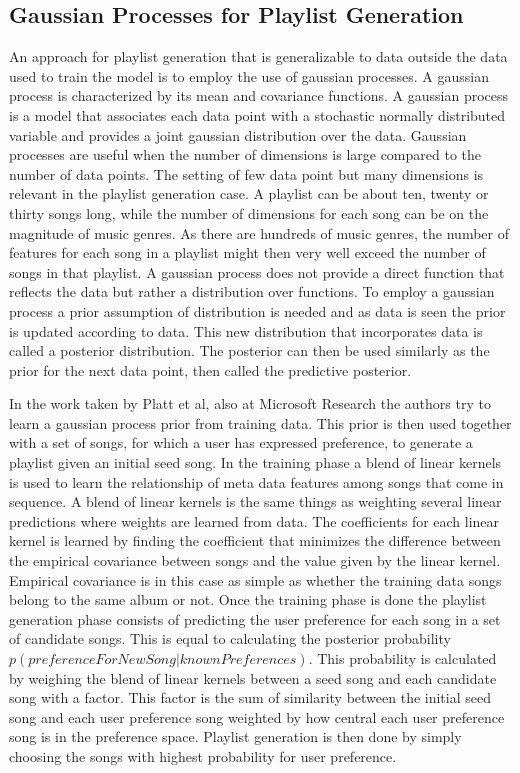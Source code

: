 \documentclass[a4paper,11pt]{kth-mag}
\begin{document}
\subsection{Gaussian Processes for Playlist Generation}
An approach for playlist generation that is generalizable to data outside the data used to train the model is to employ the use of gaussian processes\cite{platt2001learning}. A gaussian process is characterized by its mean and covariance functions\cite{mackay1998introduction}. A gaussian process is a model that associates each data point with a stochastic normally distributed variable and provides a joint gaussian distribution over the data\cite{rasmussen2004gaussian}. Gaussian processes are useful when the number of dimensions is large compared to the number of data points. The setting of few data point but many dimensions is relevant in the playlist generation case. A playlist can be about ten, twenty or thirty songs long, while the number of dimensions for each song can be on the magnitude of music genres. As there are hundreds of music genres, the number of features for each song in a playlist might then very well exceed the number of songs in that playlist.  A gaussian process does not provide a direct function that reflects the data but rather a distribution over functions\cite{rasmussen2006gaussian}. To employ a gaussian process a prior assumption of distribution is needed and as data is seen the prior is updated according to data. This new distribution that incorporates data is called a posterior distribution. The posterior can then be used similarly as the prior for the next data point, then called the predictive posterior. 

In the work taken by Platt et al, also at Microsoft Research the authors try to learn a gaussian process prior from training data\cite{platt2001learning}. This prior is then used together with a set of songs, for which a user has expressed preference, to generate a playlist given an initial seed song. In the training phase a blend of linear kernels is used to learn the relationship of meta data features among songs that come in sequence. A blend of linear kernels is the same things as weighting several linear predictions where weights are learned from data. The coefficients for each linear kernel is learned by finding the coefficient that minimizes the difference between the empirical covariance between songs and the value given by the linear kernel. Empirical covariance is in this case as simple as whether the training data songs belong to the same album or not. Once the training phase is done the playlist generation phase consists of predicting the user preference for each song in a set of candidate songs. This is equal to calculating the posterior probability $p(preference For New Song | known Preferences)$. This probability is calculated by weighing the blend of linear kernels between a seed song and each candidate song with a factor. This factor is the sum of similarity between the initial seed song and each user preference song weighted by how central each user preference song is in the preference space. Playlist generation is then done by simply choosing the songs with highest probability for user preference\cite{platt2001learning}.
\end{document}

